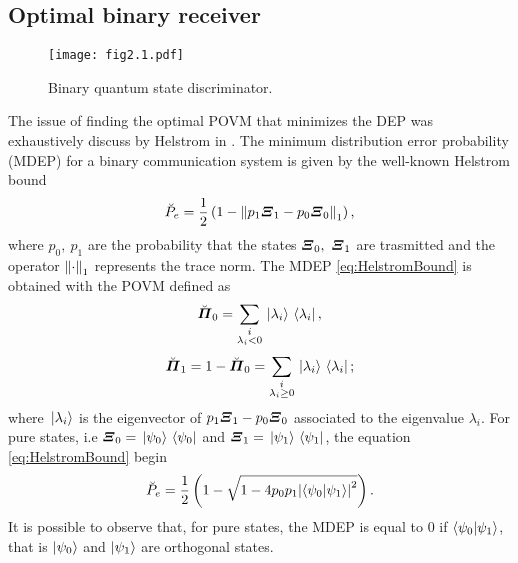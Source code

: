     \subsection{Optimal binary receiver}
    \begin{figure}[t]
        \begin{center}
            \texttt{[image: fig2.1.pdf]}
            \caption{Binary quantum state discriminator.}
            \label{fig:2.2}
        \end{center}
    \end{figure}
    The issue of finding the optimal POVM that minimizes the DEP was exhaustively discuss  by Helstrom in 
    \cite{helstrom3,helstrom4}. The minimum distribution error probability (MDEP) for a binary 
    communication system is given by the well-known Helstrom bound
    \begin{equation}
        \breve{P}_e = \frac{1}{2} \left(1-\norm{p_1 \Operator{\varXi}_1 - p_0 \Operator{\varXi}_0}_1 \right),
        \label{eq:HelstromBound}
    \end{equation}
    where $p_0,\ p_1$ are the probability that the states $\Operator{\varXi}_0,\ \Operator{\varXi}_1$ are trasmitted
    and the operator $\norm{\cdot}_1$ represents the trace norm. 
    The MDEP \ref{eq:HelstromBound} is obtained with the POVM defined as
    \begin{equation}
        \breve{\Operator{\varPi}}_0 = \sum_{\substack{i \\ \lambda_i<0}} \ket*{\lambda_i}\bra*{\lambda_i},
    \end{equation}
    \begin{equation*}
        \breve{\Operator{\varPi}}_1 = 1-\breve{\Operator{\varPi}}_0 = 
        \sum_{\substack{i \\ \lambda_i \geq 0}} \ket*{\lambda_i}\bra*{\lambda_i};
    \end{equation*}
    where $\ket*{\lambda_i}$ is the eigenvector of $p_1 \Operator{\varXi}_1 - p_0 \Operator{\varXi}_0$ associated to 
    the eigenvalue $\lambda_i$.
    For pure states, i.e $\Operator{\varXi}_0 = \ket*{\psi_0}\bra*{\psi_0}$ and $\Operator{\varXi}_1 = \ket*{\psi_1}
    \bra*{\psi_1}$, the equation \ref{eq:HelstromBound} begin
    \begin{equation}
        \breve{P}_e = \frac{1}{2} \left(1- \sqrt{1-4 p_0 p_1 \absolutevalue{\braket{\psi_0}{\psi_1}}^2}
        \right).
        \label{eq:HelstromBPure}
    \end{equation}
    It is possible to observe that, for pure states, the MDEP is equal to $0$ if $\braket{\psi_0}{\psi_1}$,
    that is $\ket{\psi_0}$ and $\ket{\psi_1}$ are orthogonal states.